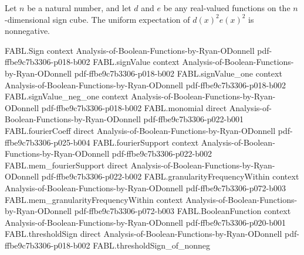 \begin{theorem}
\label{FABL.expect_sq_mul_sq_nonneg}
\leanok
{}
Let $n$ be a natural number, and let $d$ and $e$ be any real-valued functions on the
$n$-dimensional sign cube. The uniform expectation of $d(x)^2e(x)^2$ is nonnegative.
\end{theorem}

\begin{theorem}
\label{FABL.fourthMoment_le_nine_of_slice}
\leanok
{}
\proofstep
  {FABL.Sign}
  {context}
  {Analysis-of-Boolean-Functions-by-Ryan-ODonnell}
  {pdf-ffbe9c7b3306-p018-b002}
\proofstep
  {FABL.signValue}
  {context}
  {Analysis-of-Boolean-Functions-by-Ryan-ODonnell}
  {pdf-ffbe9c7b3306-p018-b002}
\proofstep
  {FABL.signValue_one}
  {context}
  {Analysis-of-Boolean-Functions-by-Ryan-ODonnell}
  {pdf-ffbe9c7b3306-p018-b002}
\proofstep
  {FABL.signValue_neg_one}
  {context}
  {Analysis-of-Boolean-Functions-by-Ryan-ODonnell}
  {pdf-ffbe9c7b3306-p018-b002}
\proofstep
  {FABL.monomial}
  {direct}
  {Analysis-of-Boolean-Functions-by-Ryan-ODonnell}
  {pdf-ffbe9c7b3306-p022-b001}
\proofstep
  {FABL.fourierCoeff}
  {direct}
  {Analysis-of-Boolean-Functions-by-Ryan-ODonnell}
  {pdf-ffbe9c7b3306-p025-b004}
\proofstep
  {FABL.fourierSupport}
  {context}
  {Analysis-of-Boolean-Functions-by-Ryan-ODonnell}
  {pdf-ffbe9c7b3306-p022-b002}
\proofstep
  {FABL.mem_fourierSupport}
  {direct}
  {Analysis-of-Boolean-Functions-by-Ryan-ODonnell}
  {pdf-ffbe9c7b3306-p022-b002}
\proofstep
  {FABL.granularityFrequencyWithin}
  {context}
  {Analysis-of-Boolean-Functions-by-Ryan-ODonnell}
  {pdf-ffbe9c7b3306-p072-b003}
\proofstep
  {FABL.mem_granularityFrequencyWithin}
  {context}
  {Analysis-of-Boolean-Functions-by-Ryan-ODonnell}
  {pdf-ffbe9c7b3306-p072-b003}
\proofstep
  {FABL.BooleanFunction}
  {context}
  {Analysis-of-Boolean-Functions-by-Ryan-ODonnell}
  {pdf-ffbe9c7b3306-p020-b001}
\proofstep
  {FABL.thresholdSign}
  {direct}
  {Analysis-of-Boolean-Functions-by-Ryan-ODonnell}
  {pdf-ffbe9c7b3306-p018-b002}
\proofstep
  {FABL.thresholdSign_of_nonneg}

\end{theorem}
